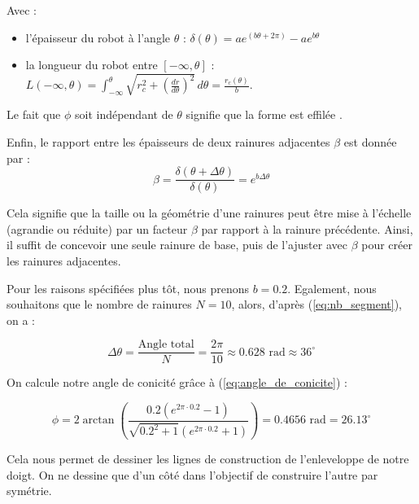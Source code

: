 \documentclass[a4paper, 11pt]{report}
\begin{document}
            Avec :

            \begin{itemize}
                \item l'épaisseur du robot à l'angle $\theta$ : $\delta(\theta) = ae^{(b\theta + 2\pi)} - ae^{b\theta}$
                \item la longueur du robot entre $[-\infty,\theta]$ : $L(-\infty, \theta) = \int_{-\infty}^{\theta} \sqrt{r_c^2 + \left(\frac{dr}{d\theta}\right)^2} \, d\theta = \frac{r_c(\theta)}{b}$.
            \end{itemize}

            Le fait que $\phi$ soit indépendant de $\theta$ signifie que la forme est effilée \cite{wang_spirobs_2025}.

            Enfin, le rapport entre les épaisseurs de deux rainures adjacentes \(\beta\) est donnée par :
            \begin{equation}
            \beta = \frac{\delta(\theta + \Delta\theta)}{\delta(\theta)} = e^{b \Delta\theta}
            \label{eq:beta}
            \end{equation}
            
            Cela signifie que la taille ou la géométrie d’une rainures peut être mise à l’échelle (agrandie ou réduite) par un facteur $\beta$ par rapport à la rainure précédente. Ainsi, il suffit de concevoir une seule rainure de base, puis de l’ajuster avec $\beta$ pour créer les rainures adjacentes.

            Pour les raisons spécifiées plus tôt, nous prenons $b = 0.2$. Egalement, nous souhaitons que le nombre de rainures $N = 10$, alors, d'après (\ref{eq:nb_segment}), on a :

            \[
            \Delta\theta= \frac{\text{Angle total}}{N} = \frac{2\pi}{10} \approx 0.628 \text{ rad} \approx 36^{\circ}
            \]
            
            On calcule notre angle de conicité grâce à (\ref{eq:angle_de_conicite}) :
            
            \[
            \phi = 2 \arctan\left( \frac{0.2\left(e^{2\pi \cdot 0.2} - 1\right)}{\sqrt{0.2^2 + 1} \left(e^{2\pi \cdot 0.2} + 1\right)} \right)
            = 0.4656 \text{ rad}
            = 26.13^{\circ}
            \]

            Cela nous permet de dessiner les lignes de construction de l'enleveloppe de notre doigt. On ne dessine que d'un côté dans l'objectif de construire l'autre par symétrie.
\end{document}
